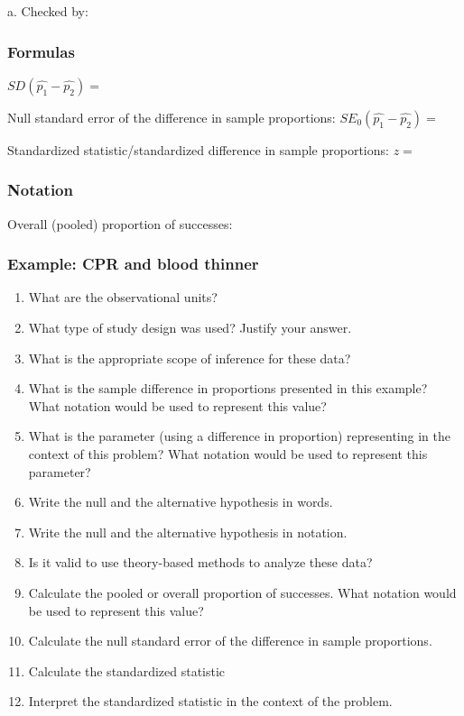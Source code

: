 \documentclass[
]{report}
\newcommand{\rgs}{\vspace{12pt}} %
\newcommand{\rgi}{\hspace{24pt}}  %
\begin{document}
\rgi a. Checked by:
\rgs

\hypertarget{formulas-6}{%
\subsubsection*{Formulas}\label{formulas-6}}

\(SD(\hat{p_1} - \hat{p_2})=\)
\rgs

Null standard error of the difference in sample proportions:
\(SE_0(\hat{p_1} - \hat{p_2})=\)
\rgs

Standardized statistic/standardized difference in sample proportions:
\(z=\)
\rgs

\hypertarget{notation}{%
\subsubsection*{Notation}\label{notation}}

Overall (pooled) proportion of successes:
\rgs

\hypertarget{example-cpr-and-blood-thinner-1}{%
\subsubsection*{Example: CPR and blood thinner}\label{example-cpr-and-blood-thinner-1}}

\begin{enumerate}
\def\labelenumi{\arabic{enumi}.}
\item
  What are the observational units?
  \rgs
\item
  What type of study design was used? Justify your answer.
  \rgs
\item
  What is the appropriate scope of inference for these data?
  \rgs
\item
  What is the sample difference in proportions presented in this example? What notation would be used to represent this value?
  \rgs
\item
  What is the parameter (using a difference in proportion) representing in the context of this problem? What notation would be used to represent this parameter?
  \rgs
\item
  Write the null and the alternative hypothesis in words.
  \rgs
  \rgs
\item
  Write the null and the alternative hypothesis in notation.
  \rgs
\item
  Is it valid to use theory-based methods to analyze these data?
  \rgs
  \rgs
\item
  Calculate the pooled or overall proportion of successes. What notation would be used to represent this value?
  \rgs
\item
  Calculate the null standard error of the difference in sample proportions.
  \rgs
\item
  Calculate the standardized statistic
  \rgs
\item
  Interpret the standardized statistic in the context of the problem.
  \rgs
  \rgs
\end{enumerate}
\end{document}
